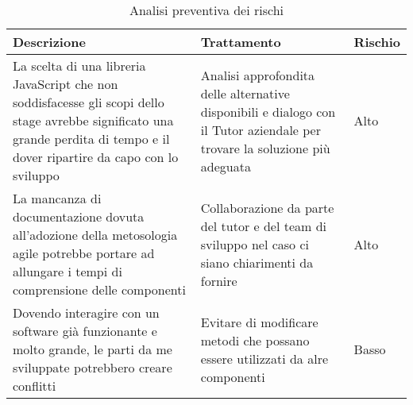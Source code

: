 \begin{table} %
	\centering
	\caption{Analisi preventiva dei rischi}
	\label{tab:analisi-dei-rischi}
	\begin{tabular}{|p{5cm}|p{5cm}|p{3cm}|}
		\hline
		Descrizione & Trattamento & Rischio\\
		\hline
		La scelta di una libreria JavaScript che non soddisfacesse gli scopi dello stage avrebbe significato una grande perdita di tempo e il dover ripartire da capo con lo sviluppo & Analisi approfondita delle alternative disponibili e dialogo con il Tutor aziendale per trovare la soluzione più adeguata & Alto\\
		\hline
		La mancanza di documentazione dovuta all'adozione della metosologia agile potrebbe portare ad allungare i tempi di comprensione delle componenti & Collaborazione da parte del tutor e del team di sviluppo nel caso ci siano chiarimenti da fornire & Alto\\
		\hline
		Dovendo interagire con un software già funzionante e molto grande, le parti da me sviluppate potrebbero creare conflitti & Evitare di modificare metodi che possano essere utilizzati da alre componenti & Basso\\
		\hline
		
	\end{tabular}
\end{table}

\newpage